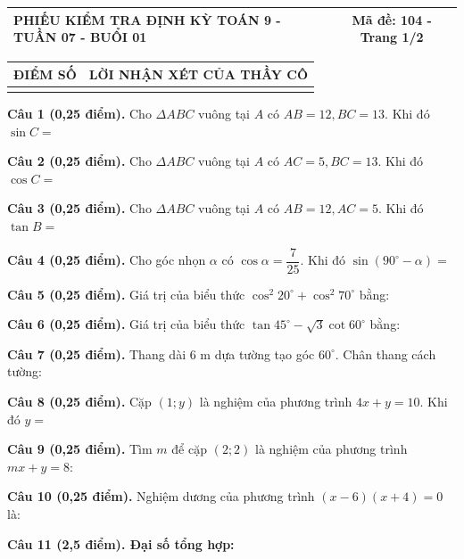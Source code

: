 \documentclass[12pt,a4paper]{article}
\begin{document}
\noindent
\begin{tabularx}{\linewidth}{|X|c|}
\hline
\textbf{PHIẾU KIỂM TRA ĐỊNH KỲ TOÁN 9 - TUẦN 07 - BUỔI 01} & \textbf{Mã đề: 104 - Trang 1/2} \\
\hline
\end{tabularx}

\vspace{1.0mm}

\noindent
\begin{tabularx}{\linewidth}{|p{3.2cm}|X|}
\hline
\centering\textbf{ĐIỂM SỐ} & \centering\textbf{LỜI NHẬN XÉT CỦA THẦY CÔ} \tabularnewline
\hline
\rule{0pt}{1.8cm} & \tabularnewline
\hline
\end{tabularx}

\vspace{1.2mm}
\noindent\textbf{Câu 1 (0,25 điểm).} Cho $\Delta ABC$ vuông tại $A$ có $AB = 12, BC = 13$. Khi đó $\sin C =$ \par\vspace{0.8mm}
\noindent\textbf{Câu 2 (0,25 điểm).} Cho $\Delta ABC$ vuông tại $A$ có $AC = 5, BC = 13$. Khi đó $\cos C =$ \par\vspace{0.8mm}
\noindent\textbf{Câu 3 (0,25 điểm).} Cho $\Delta ABC$ vuông tại $A$ có $AB = 12, AC = 5$. Khi đó $\tan B =$ \par\vspace{0.8mm}
\noindent\textbf{Câu 4 (0,25 điểm).} Cho góc nhọn $\alpha$ có $\cos \alpha = \dfrac{7}{25}$. Khi đó $\sin(90^\circ - \alpha) =$ \par\vspace{0.8mm}
\noindent\textbf{Câu 5 (0,25 điểm).} Giá trị của biểu thức $\cos^2 20^\circ + \cos^2 70^\circ$ bằng: \par\vspace{0.8mm}
\noindent\textbf{Câu 6 (0,25 điểm).} Giá trị của biểu thức $\tan 45^\circ - \sqrt{3}\cot 60^\circ$ bằng: \par\vspace{0.8mm}
\noindent\textbf{Câu 7 (0,25 điểm).} Thang dài $6\text{ m}$ dựa tường tạo góc $60^\circ$. Chân thang cách tường: \par\vspace{0.8mm}
\noindent\textbf{Câu 8 (0,25 điểm).} Cặp $(1; y)$ là nghiệm của phương trình $4x + y = 10$. Khi đó $y =$ \par\vspace{0.8mm}
\noindent\textbf{Câu 9 (0,25 điểm).} Tìm $m$ để cặp $(2; 2)$ là nghiệm của phương trình $mx + y = 8$: \par\vspace{0.8mm}
\noindent\textbf{Câu 10 (0,25 điểm).} Nghiệm dương của phương trình $(x - 6)(x + 4) = 0$ là: \par\vspace{0.8mm}
\vspace{0.8mm}
\noindent\textbf{Câu 11 (2,5 điểm). Đại số tổng hợp:}
\vspace{0.6mm}
\end{document}
